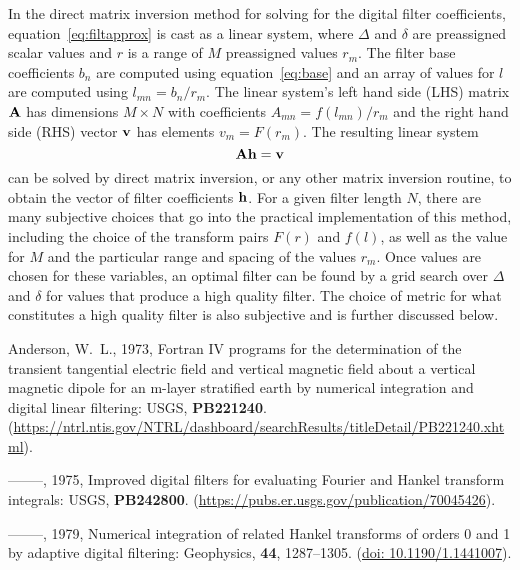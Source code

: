 \documentclass[a4paper, twoside, parskip, 10pt]{scrartcl}
\begin{document}
\begin{multicols}{2}
In the direct matrix inversion method for solving for the digital filter
coefficients, equation~\ref{eq:filtapprox} is cast as a linear system,
where $\Delta$ and $\delta$ are preassigned scalar values and
$r$ is a range of $M$ preassigned values $r_m$. The filter base coefficients
$b_n$ are computed using equation~\ref{eq:base} and an array of values for $l$
are computed using $l_{mn} = b_n/r_m$. The linear system's left hand side (LHS)
matrix $\bf{A}$ has dimensions $M \times N$ with coefficients
$A_{mn} = f(l_{mn})/r_m$ and the right hand side (RHS)
vector $\bf{v}$ has elements $v_m = F(r_m)$. The
resulting linear system
%
\begin{equation}
  \bf{A}\bf{h} = \bf{v}
  \label{eq:,linearSystem}
\end{equation}
%
can be solved by direct matrix inversion, or any other matrix inversion
routine, to obtain the vector of filter coefficients $\bf{h}$. For a given
filter length $N$, there are many subjective choices that go into the practical
implementation of this method, including the choice of the transform pairs
$F(r)$ and $f(l)$, as well as the value for $M$ and the particular range and
spacing of the values $r_m$. Once values are chosen for these variables, an
optimal filter can be found by a grid search over $\Delta$ and $\delta$ for
values that produce a high quality filter. The choice of metric for what
constitutes a high quality filter is also subjective and is further discussed
below.


\begin{thebibliography}{}
\itemsep0pt

Anderson, W.~L.,  1973, Fortran {IV} programs for the determination of the
  transient tangential electric field and vertical magnetic field about a
  vertical magnetic dipole for an m-layer stratified earth by numerical
  integration and digital linear filtering: USGS, {\bf PB221240}.
\newblock
  (\href{https://ntrl.ntis.gov/NTRL/dashboard/searchResults/titleDetail/PB221240.xhtml}{https://ntrl.ntis.gov\-/NTRL\-/dashboard\-/searchResults\-/titleDetail\-/PB221240.xhtml}).

--------, 1975, Improved digital filters for evaluating {F}ourier and {H}ankel
  transform integrals: USGS, {\bf PB242800}.
\newblock
  (\href{https://pubs.er.usgs.gov/publication/70045426}{https://pubs.er.usgs.gov/publication/70045426}).

--------, 1979, Numerical integration of related {H}ankel transforms of orders
  0 and 1 by adaptive digital filtering: Geophysics, {\bf 44}, 1287--1305.
\newblock (\href{https://doi.org/10.1190/1.1441007}{doi: 10.1190/1.1441007}).


\end{thebibliography}
\end{multicols}
\end{document}
